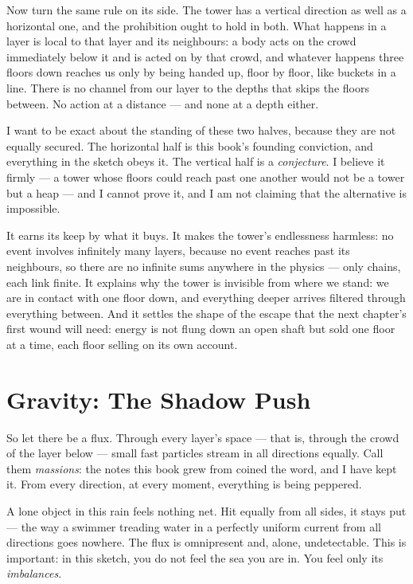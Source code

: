 \documentclass[fontsize=11pt,paper=a4,pagesize=auto,parskip=half-]{scrbook}
\begin{document}
Now turn the same rule on its side. The tower has a vertical direction as well as a horizontal one, and the prohibition ought to hold in both. What happens in a layer is local to that layer and its neighbours: a body acts on the crowd immediately below it and is acted on by that crowd, and whatever happens three floors down reaches us only by being handed up, floor by floor, like buckets in a line. There is no channel from our layer to the depths that skips the floors between. No action at a distance --- and none at a depth either.

I want to be exact about the standing of these two halves, because they are not equally secured. The horizontal half is this book's founding conviction, and everything in the sketch obeys it. The vertical half is a \emph{conjecture}. I believe it firmly --- a tower whose floors could reach past one another would not be a tower but a heap --- and I cannot prove it, and I am not claiming that the alternative is impossible.

It earns its keep by what it buys. It makes the tower's endlessness harmless: no event involves infinitely many layers, because no event reaches past its neighbours, so there are no infinite sums anywhere in the physics --- only chains, each link finite. It explains why the tower is invisible from where we stand: we are in contact with one floor down, and everything deeper arrives filtered through everything between. And it settles the shape of the escape that the next chapter's first wound will need: energy is not flung down an open shaft but sold one floor at a time, each floor selling on its own account.


\section{Gravity: The Shadow Push}

So let there be a flux. Through every layer's space --- that is, through the crowd of the layer below --- small fast particles stream in all directions equally. Call them \emph{massions}: the notes this book grew from coined the word, and I have kept it. From every direction, at every moment, everything is being peppered.

A lone object in this rain feels nothing net. Hit equally from all sides, it stays put --- the way a swimmer treading water in a perfectly uniform current from all directions goes nowhere. The flux is omnipresent and, alone, undetectable. This is important: in this sketch, you do not feel the sea you are in. You feel only its \emph{imbalances}.
\end{document}
